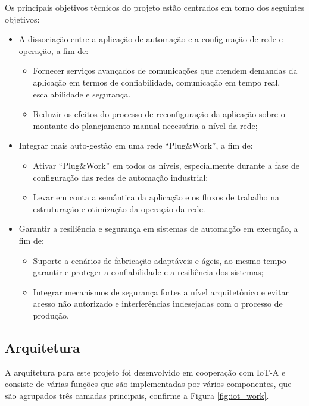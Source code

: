 Os principais objetivos técnicos do projeto estão centrados em torno
dos seguintes objetivos:
\begin{itemize}
\item A dissociação entre a aplicação de automação e a configuração de rede
e operação, a fim de:

\begin{itemize}
\item Fornecer serviços avançados de comunicações que atendem demandas da
aplicação em termos de confiabilidade, comunicação em tempo real,
escalabilidade e segurança.
\item Reduzir os efeitos do processo de reconfiguração da aplicação sobre
o montante do planejamento manual necessária a nível da rede; 
\end{itemize}
\item Integrar mais auto-gestão em uma rede ``Plug\&Work'', a fim de:

\begin{itemize}
\item Ativar ``Plug\&Work'' em todos os níveis, especialmente durante
a fase de configuração das redes de automação industrial;
\item Levar em conta a semântica da aplicação e os fluxos de trabalho na
estruturação e otimização da operação da rede.
\end{itemize}
\item Garantir a resiliência e segurança em sistemas de automação em execução,
a fim de:

\begin{itemize}
\item Suporte a cenários de fabricação adaptáveis e ágeis, ao mesmo tempo
garantir e proteger a confiabilidade e a resiliência dos sistemas;
\item Integrar mecanismos de segurança fortes a nível arquitetônico e evitar
acesso não autorizado e interferências indesejadas com o processo
de produção.
\end{itemize}
\end{itemize}

\subsection{Arquitetura}

A arquitetura para este projeto foi desenvolvido em cooperação com
IoT-A\cite{rotondi2011project} e consiste de várias funções que são
implementadas por vários componentes, que são agrupados três camadas
principais, confirme a Figura \ref{fig:iot_work}.

